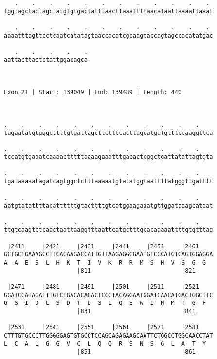 \documentclass{article}
\begin{document}
\begin{Verbatim}
   .    .    .    .    .    .    .    .    .    .    .    . 
tggtagctactagctatgtgtgactatttaacttaaattttaacataattaaaattaaat
                                                            
   .    .    .    .    .    .    .    .    .    .    .    . 
aaaatttagttcctcaatcatatagtaaccacatcgcaagtaccagtagccacatatgac
                                                            
   .    .    .    .    .
aattacttactctattggacagca
                        
                        
 
Exon 21 | Start: 139049 | End: 139489 | Length: 440



.    .    .    .    .    .    .    .    .    .    .    .    
tagaatatgtgggcttttgtgattagcttctttcacttagcatgatgtttccaaggttca
                                                            
.    .    .    .    .    .    .    .    .    .    .    .    
tccatgtgaaatcaaaactttttaaaagaaatttgacactcggctgattatattagtgta
                                                            
.    .    .    .    .    .    .    .    .    .    .    .    
tgataaaaatagatcagtggctctttaaaaatgtatatggtaattttatgggttgatttt
                                                            
.    .    .    .    .    .    .    .    .    .    .    .    
aatgtatattttacattttttgtacttttgtcatggaagaaatgttggataaagcataat
                                                            
.    .    .    .    .    .    .    .    .    .    .    .    
ttgtcaagtctcaactaattaaggtttaattcatgctttgcacaaaaattttgtgtttag
                                                            
 |2411     |2421     |2431     |2441     |2451     |2461    
GCTGCTGAAAGCCTTCACAAGACCATTGTTAAGAGGCGAATGTCCCATGTGAGTGGAGGA
A  A  E  S  L  H  K  T  I  V  K  R  R  M  S  H  V  S  G  G  
                     |811                          |821     
  
 |2471     |2481     |2491     |2501     |2511     |2521    
GGATCCATAGATTTGTCTGACACAGACTCCCTACAGGAATGGATCAACATGACTGGCTTC
G  S  I  D  L  S  D  T  D  S  L  Q  E  W  I  N  M  T  G  F  
                     |831                          |841     
  
 |2531     |2541     |2551     |2561     |2571     |2581    
CTTTGTGCCCTTGGGGGAGTGTGCCTCCAGCAGAGAAGCAATTCTGGCCTGGCAACCTAT
L  C  A  L  G  G  V  C  L  Q  Q  R  S  N  S  G  L  A  T  Y  
                     |851                          |861     
  

\end{Verbatim}
\end{document}
